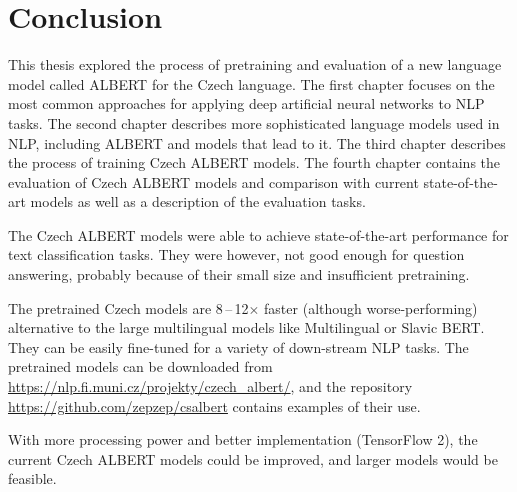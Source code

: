 \documentclass[
  printed, %
  color,   %
  table,   %
  oneside, %
  lof,     %
  lot,     %
]{fithesis3}
\begin{document}

\chapter*{Conclusion}

This thesis explored the process of pretraining and evaluation of a new language model called ALBERT for the Czech language. The first chapter focuses on the most common approaches for applying deep artificial neural networks to NLP tasks. The second chapter describes more sophisticated language models used in NLP, including ALBERT and models that lead to it. The third chapter describes the process of training Czech ALBERT models. The fourth chapter contains the evaluation of Czech ALBERT models and comparison with current state-of-the-art models as well as a description of the evaluation tasks.

The Czech ALBERT models were able to achieve state-of-the-art performance for text classification tasks. They were however, not good enough for question answering, probably because of their small size and insufficient pretraining.

The pretrained Czech models are 8\,--\,12$\times$ faster (although worse-performing) alternative to the large multilingual models like Multilingual or Slavic BERT. They can be easily fine-tuned for a variety of down-stream NLP tasks. The pretrained models can be downloaded from \url{https://nlp.fi.muni.cz/projekty/czech_albert/}, and the repository \url{https://github.com/zepzep/csalbert} contains examples of their use.

With more processing power and better implementation (TensorFlow 2), the current Czech ALBERT models could be improved, and larger models would be feasible.



\end{document}
